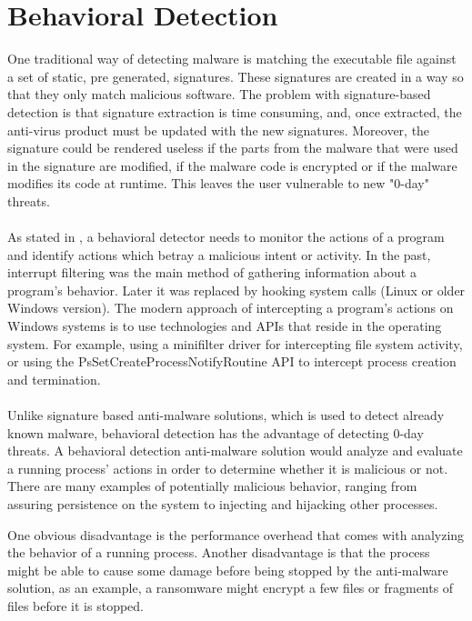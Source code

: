     \pagebreak
    
    \section{Behavioral Detection}
        One traditional way of detecting malware is matching the executable file against a set of static, pre generated, signatures. These
        signatures are created in a way so that they only match malicious software\cite{ASADMATT}. The problem with signature-based detection
        is that signature extraction is time consuming, and, once extracted, the anti-virus product must be updated with the new signatures.
        Moreover, the signature could be rendered useless if the parts from the malware that were used in the signature are modified, if
        the malware code is encrypted or if the malware modifies its code at runtime. This leaves the user vulnerable to new "0-day" threats. 

        \paragraph{}
        As stated in \cite{jacob2008behavioral}, a behavioral detector needs to monitor the actions of a program and identify actions
        which betray a malicious intent or activity. In the past, interrupt filtering was the main method of gathering information about a
        program's behavior. Later it was replaced by hooking system calls (Linux or older Windows version). The modern approach of intercepting
        a program's actions on Windows systems is to use technologies and APIs that reside in the operating system. For example, using a
        minifilter driver for intercepting file system activity, or using the PsSetCreateProcessNotifyRoutine API to intercept process
        creation and termination.

        \paragraph{}
        Unlike signature based anti-malware solutions, which is used to detect already known malware, behavioral detection has the advantage of
        detecting 0-day threats. A behavioral detection anti-malware solution would analyze and evaluate a running process' actions in order to
        determine whether it is malicious or not. There are many examples of potentially malicious behavior, ranging from assuring persistence on
        the system to injecting and hijacking other processes.

        One obvious disadvantage is the performance overhead that comes with analyzing the behavior of a running process. Another disadvantage is
        that the process might be able to cause some damage before being stopped by the anti-malware solution, as an example, a ransomware might
        encrypt a few files or fragments of files before it is stopped.
        